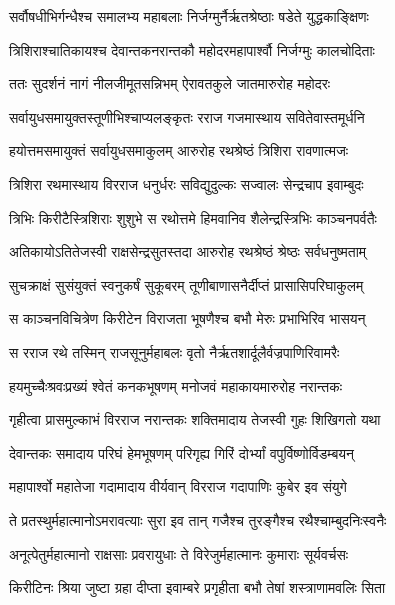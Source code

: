\twolineshloka
{सर्वौषधीभिर्गन्धैश्च समालभ्य महाबलाः}
{निर्जग्मुर्नैर्ऋतश्रेष्ठाः षडेते युद्धकाङ्क्षिणः} %

\twolineshloka
{त्रिशिराश्चातिकायश्च देवान्तकनरान्तकौ}
{महोदरमहापार्श्वौ निर्जग्मुः कालचोदिताः} %

\twolineshloka
{ततः सुदर्शनं नागं नीलजीमूतसन्निभम्}
{ऐरावतकुले जातमारुरोह महोदरः} %

\twolineshloka
{सर्वायुधसमायुक्तस्तूणीभिश्चाप्यलङ्कृतः}
{रराज गजमास्थाय सवितेवास्तमूर्धनि} %

\twolineshloka
{हयोत्तमसमायुक्तं सर्वायुधसमाकुलम्}
{आरुरोह रथश्रेष्ठं त्रिशिरा रावणात्मजः} %

\twolineshloka
{त्रिशिरा रथमास्थाय विरराज धनुर्धरः}
{सविद्युदुल्कः सज्वालः सेन्द्रचाप इवाम्बुदः} %

\twolineshloka
{त्रिभिः किरीटैस्त्रिशिराः शुशुभे स रथोत्तमे}
{हिमवानिव शैलेन्द्रस्त्रिभिः काञ्चनपर्वतैः} %

\twolineshloka
{अतिकायोऽतितेजस्वी राक्षसेन्द्रसुतस्तदा}
{आरुरोह रथश्रेष्ठं श्रेष्ठः सर्वधनुष्मताम्} %

\twolineshloka
{सुचक्राक्षं सुसंयुक्तं स्वनुकर्षं सुकूबरम्}
{तूणीबाणासनैर्दीप्तं प्रासासिपरिघाकुलम्} %

\twolineshloka
{स काञ्चनविचित्रेण किरीटेन विराजता}
{भूषणैश्च बभौ मेरुः प्रभाभिरिव भासयन्} %

\twolineshloka
{स रराज रथे तस्मिन् राजसूनुर्महाबलः}
{वृतो नैर्ऋतशार्दूलैर्वज्रपाणिरिवामरैः} %

\twolineshloka
{हयमुच्चैःश्रवःप्रख्यं श्वेतं कनकभूषणम्}
{मनोजवं महाकायमारुरोह नरान्तकः} %

\twolineshloka
{गृहीत्वा प्रासमुल्काभं विरराज नरान्तकः}
{शक्तिमादाय तेजस्वी गुहः शिखिगतो यथा} %

\twolineshloka
{देवान्तकः समादाय परिघं हेमभूषणम्}
{परिगृह्य गिरिं दोर्भ्यां वपुर्विष्णोर्विडम्बयन्} %

\twolineshloka
{महापार्श्वो महातेजा गदामादाय वीर्यवान्}
{विरराज गदापाणिः कुबेर इव संयुगे} %

\twolineshloka
{ते प्रतस्थुर्महात्मानोऽमरावत्याः सुरा इव}
{तान् गजैश्च तुरङ्गैश्च रथैश्चाम्बुदनिःस्वनैः} %

\twolineshloka
{अनूत्पेतुर्महात्मानो राक्षसाः प्रवरायुधाः}
{ते विरेजुर्महात्मानः कुमाराः सूर्यवर्चसः} %

\twolineshloka
{किरीटिनः श्रिया जुष्टा ग्रहा दीप्ता इवाम्बरे}
{प्रगृहीता बभौ तेषां शस्त्राणामवलिः सिता} %

